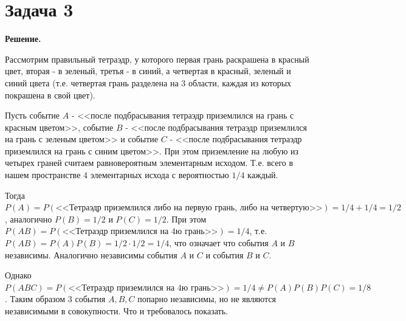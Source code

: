 \documentclass{article}
\begin{document}
\section*{Задача 3}
{\bf Решение.} 
\par
Рассмотрим правильный тетраэдр, у которого первая грань раскрашена в красный цвет, вторая - в зеленый, третья - в синий, а четвертая в красный, зеленый и синий цвета (т.е. четвертая грань разделена на 3 области, каждая из которых покрашена в свой цвет).
\par
Пусть событие $A$ - <<после подбрасывания тетраэдр приземлился на грань с красным цветом>>, событие $B$ - <<после подбрасывания тетраэдр приземлился на грань с зеленым цветом>> и событие $C$ - <<после подбрасывания тетраэдр приземлился на грань с синим цветом>>. При этом приземление на любую из четырех граней считаем равновероятным элементарным исходом. Т.е. всего в нашем пространстве 4 элементарных исхода с вероятностью $1/4$ каждый. 
\par
Тогда $P(A)=P(\text{<<Тетраэдр приземлился либо на первую грань, либо на четвертую>>})=1/4+1/4=1/2$, аналогично $P(B)=1/2$ и $P(C)=1/2$. При этом $P(AB)=P(\text{<<Тетраэдр приземлился на 4ю грань>>})=1/4$, т.е. $P(AB)=P(A)P(B)=1/2\cdot 1/2=1/4$, что означает что события $A$ и $B$ независимы. Аналогично независимы события $A$ и $C$ и события $B$ и $C$.
\par
Однако $P(ABC)=P(\text{<<Тетраэдр приземлился на 4ю грань>>})=1/4\neq P(A)P(B)P(C)=1/8$. Таким образом 3 события $A,B,C$ попарно независимы, но не являются независимыми в совокупности. Что и требовалось показать.
\end{document}

